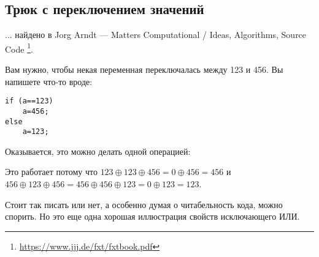 \subsection{Трюк с переключением значений}

... найдено в Jorg Arndt --- Matters Computational / Ideas, Algorithms, Source Code
\footnote{\url{https://www.jjj.de/fxt/fxtbook.pdf}}.

Вам нужно, чтобы некая переменная переключалась между 123 и 456.
Вы напишете что-то вроде:

\begin{lstlisting}
if (a==123)
    a=456;
else
    a=123;
\end{lstlisting}

Оказывается, это можно делать одной операцией:



Это работает потому что $123 \oplus 123 \oplus 456=0 \oplus 456=456$ и
$456 \oplus 123 \oplus 456=456 \oplus 456 \oplus 123=0 \oplus 123=123$.

Стоит так писать или нет, а особенно думая о читабельность кода, можно спорить.
Но это еще одна хорошая иллюстрация свойств исключающего ИЛИ.

